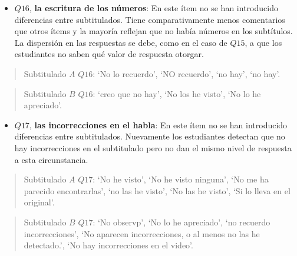 \documentclass[
  12pt,
  a4paper,
  extrafontsizes,
  onecolumn,
  openright,
  table]{memoir}
\providecommand{\tightlist}{%
  \setlength{\itemsep}{0pt}\setlength{\parskip}{0pt}}\usepackage{longtable,booktabs,array}
\begin{document}
\color{black}
\normalsize

\begin{itemize}
\tightlist
\item
  \(Q16\), \textbf{la escritura de los números}: En este ítem no se han
  introducido diferencias entre subtitulados. Tiene comparativamente
  menos comentarios que otros ítems y la mayoría reflejan que no había
  números en los subtítulos. La dispersión en las respuestas se debe,
  como en el caso de \(Q15\), a que los estudiantes no saben qué valor
  de respuesta otorgar.
\end{itemize}

\scriptsize
\color{blue}

\begin{quote}
Subtitulado \(A\) \(Q16\): \enquote*{No lo recuerdo}, \enquote*{NO
recuerdo}, \enquote*{no hay}, \enquote*{no hay}.
\end{quote}

\color{black}
\normalsize

\scriptsize
\color{red}

\begin{quote}
Subtitulado \(B\) \(Q16\): \enquote*{creo que no hay}, \enquote*{No los
he visto}, \enquote*{No lo he apreciado}.
\end{quote}

\color{black}
\normalsize

\begin{itemize}
\tightlist
\item
  \(Q17\), \textbf{las incorrecciones en el habla}: En este ítem no se
  han introducido diferencias entre subtitulados. Nuevamente los
  estudiantes detectan que no hay incorrecciones en el subtitulado pero
  no dan el mismo nivel de respuesta a esta circunstancia.
\end{itemize}

\scriptsize
\color{blue}

\begin{quote}
Subtitulado \(A\) \(Q17\): \enquote*{No he visto}, \enquote*{No he visto
ninguna}, \enquote*{No me ha parecido encontrarlas}, \enquote*{no las he
visto}, \enquote*{No las he visto}, \enquote*{Si lo lleva en el
original}.
\end{quote}

\color{black}
\normalsize

\scriptsize
\color{red}

\begin{quote}
Subtitulado \(B\) \(Q17\): \enquote*{No observp}, \enquote*{No lo he
apreciado}, \enquote*{no recuerdo incorrecciones}, \enquote*{No aparecen
incorrecciones, o al menos no las he detectado.}, \enquote*{No hay
incorrecciones en el video}.
\end{quote}
\end{document}
